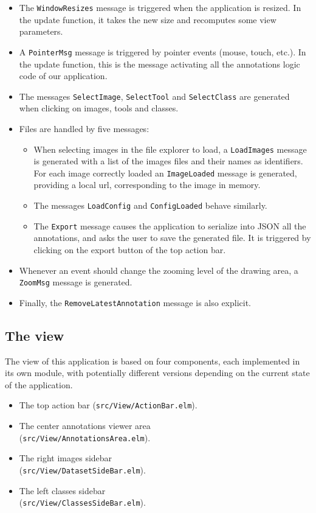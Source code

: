\begin{itemize}
\item The \verb|WindowResizes| message is triggered when the application is resized.
	In the update function, it takes the new size and recomputes some view parameters.
\item A \verb|PointerMsg| message is triggered by pointer events (mouse, touch, etc.).
	In the update function, this is the message activating
	all the annotations logic code of our application.
\item The messages \verb|SelectImage|, \verb|SelectTool| and \verb|SelectClass|
	are generated when clicking on images, tools and classes.
\item Files are handled by five messages:
	\begin{itemize}
	\item When selecting images in the file explorer to load,
		a \verb|LoadImages| message is generated with a list of the images files
		and their names as identifiers.
		For each image correctly loaded an \verb|ImageLoaded| message is generated,
		providing a local url, corresponding to the image in memory.
    \item The messages \verb|LoadConfig| and \verb|ConfigLoaded| behave similarly.
    \item The \verb|Export| message causes the application to serialize into JSON
		all the annotations, and asks the user to save the generated file.
		It is triggered by clicking on the export button of the top action bar.
	\end{itemize}
\item Whenever an event should change the zooming level of the drawing area,
	a \verb|ZoomMsg| message is  generated.
\item Finally, the \verb|RemoveLatestAnnotation| message is also explicit.
\end{itemize}


\subsection{The view}

The view of this application is based on four components,
each implemented in its own module, with potentially different versions
depending on the current state of the application.
\begin{itemize}
\item The top action bar (\verb|src/View/ActionBar.elm|).
\item The center annotations viewer area\\(\verb|src/View/AnnotationsArea.elm|).
\item The right images sidebar\\(\verb|src/View/DatasetSideBar.elm|).
\item The left classes sidebar\\(\verb|src/View/ClassesSideBar.elm|).
\end{itemize}


